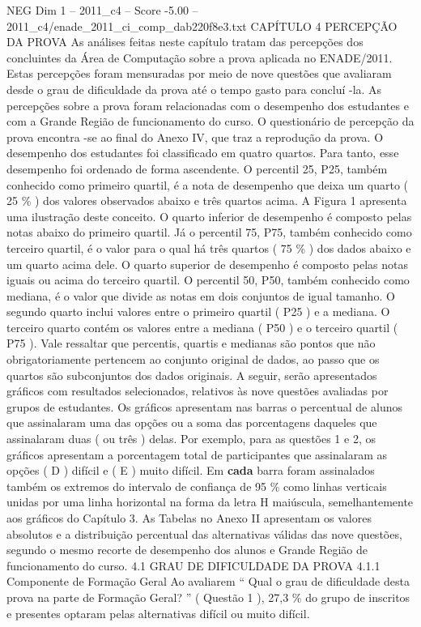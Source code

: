 \begin{textsample}{NEG Dim 1 – 2011\_c4 – Score -5.00 – 2011\_c4/enade\_2011\_ci\_comp\_dab220f8e3.txt}  \label{ex:f1_neg_113}
CAPÍTULO 4 PERCEPÇÃO DA PROVA As análises feitas neste capítulo tratam das percepções dos concluintes da Área de Computação sobre a prova aplicada no ENADE/2011.
Estas percepções foram mensuradas por meio de nove questões que avaliaram desde o grau de dificuldade da prova até o tempo gasto para concluí -la.
As percepções sobre a prova foram relacionadas com o desempenho dos estudantes e com a Grande Região de funcionamento do curso.
O questionário de percepção da prova encontra -se ao final do Anexo IV, que traz a reprodução da prova.
O desempenho dos estudantes foi classificado em quatro quartos.
Para tanto, esse desempenho foi ordenado de forma ascendente.
O percentil 25, P25, também conhecido como primeiro quartil, é a nota de desempenho que deixa um quarto ( 25 \% ) dos valores observados abaixo e três quartos acima.
A Figura 1 apresenta uma ilustração deste conceito.
O quarto inferior de desempenho é composto pelas notas abaixo do primeiro quartil.
Já o percentil 75, P75, também conhecido como terceiro quartil, é o valor para o qual há três quartos ( 75 \% ) dos dados abaixo e um quarto acima dele.
O quarto superior de desempenho é composto pelas notas iguais ou acima do terceiro quartil.
O percentil 50, P50, também conhecido como mediana, é o valor que divide as notas em dois conjuntos de igual tamanho.
O segundo quarto inclui valores entre o primeiro quartil ( P25 ) e a mediana.
O terceiro quarto contém os valores entre a mediana ( P50 ) e o terceiro quartil ( P75 ).
Vale ressaltar que percentis, quartis e medianas são pontos que não obrigatoriamente pertencem ao conjunto original de dados, ao passo que os quartos são subconjuntos dos dados originais.
A seguir, serão apresentados gráficos com resultados selecionados, relativos às nove questões avaliadas por grupos de estudantes.
Os gráficos apresentam nas barras o percentual de alunos que assinalaram uma das opções ou a soma das porcentagens daqueles que assinalaram duas ( ou três ) delas.
Por exemplo, para as questões 1 e 2, os gráficos apresentam a porcentagem total de participantes que assinalaram as opções ( D ) difícil e ( E ) muito difícil.
Em \textbf{cada} barra foram assinalados também os extremos do intervalo de confiança de 95 \% como linhas verticais unidas por uma linha horizontal na forma da letra H maiúscula, semelhantemente aos gráficos do Capítulo 3.
As Tabelas no Anexo II apresentam os valores absolutos e a distribuição percentual das alternativas válidas das nove questões, segundo o mesmo recorte de desempenho dos alunos e Grande Região de funcionamento do curso. 4.1 GRAU DE DIFICULDADE DA PROVA 4.1.1 Componente de Formação Geral Ao avaliarem “ Qual o grau de dificuldade desta prova na parte de Formação Geral? ” ( Questão 1 ), 27,3 \% do grupo de inscritos e presentes optaram pelas alternativas difícil ou muito difícil.

\end{textsample}
